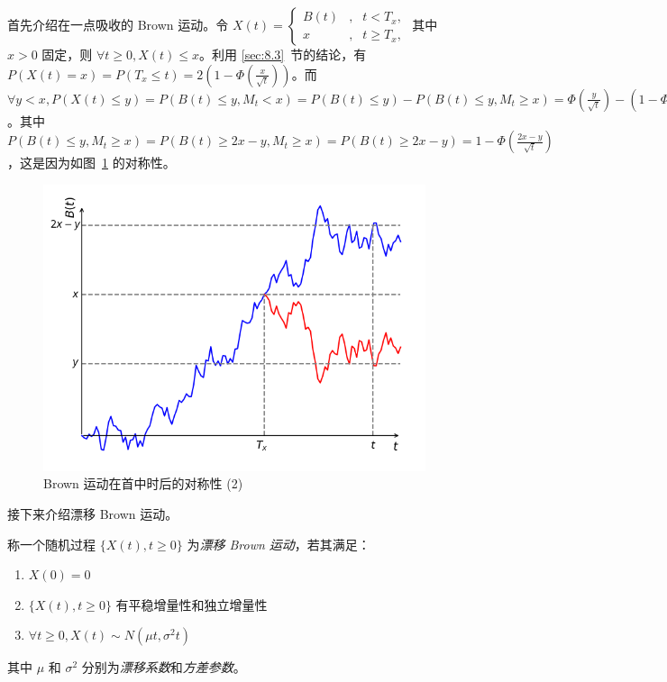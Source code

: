 \documentclass[../main.tex]{subfiles}
\begin{document}
首先介绍在一点吸收的 Brown 运动。令 $X(t)=
    \left\{\begin{aligned}
        B(t) & , & t<T_x,     \\
        x    & , & t\geq T_x,
    \end{aligned}\right.$ 其中 $x>0$ 固定，则 $\forall t\geq0,X(t)\leq x$。利用 \ref{sec:8.3}~节的结论，有 $P(X(t)=x)=P(T_x\leq t)=2(1-\Phi(\frac x{\sqrt t}))$。而 $\forall y<x,P(X(t)\leq y)=P(B(t)\leq y,M_t<x)=P(B(t)\leq y)-P(B(t)\leq y,M_t\geq x)=\Phi(\frac y{\sqrt t})-(1-\Phi(\frac{2x-y}{\sqrt t}))$。其中 $P(B(t)\leq y,M_t\geq x)=P(B(t)\geq 2x-y,M_t\geq x)=P(B(t)\geq 2x-y)=1-\Phi(\frac{2x-y}{\sqrt t})$，这是因为如图~\ref{fig:8.4.1} 的对称性。

\begin{figure}[!h]
    \centering
    \includegraphics[scale=0.7]{figures/brownian_motion_symmetry_2.png}
    \caption{Brown 运动在首中时后的对称性 (2)}
    \label{fig:8.4.1}
\end{figure}

接下来介绍漂移 Brown 运动。

\begin{definition}\label{def:8.4.1}
    称一个随机过程 $\{X(t),t\geq0\}$ 为\emph{漂移 Brown 运动}，若其满足：
    \begin{enumerate}
        \item $X(0)=0$
        \item $\{X(t),t\geq0\}$ 有平稳增量性和独立增量性
        \item $\forall t\geq0,X(t)\sim N(\mu t,\sigma^2t)$
    \end{enumerate}
    其中 $\mu$ 和 $\sigma^2$ 分别为\emph{漂移系数}和\emph{方差参数}。
\end{definition}
\end{document}

